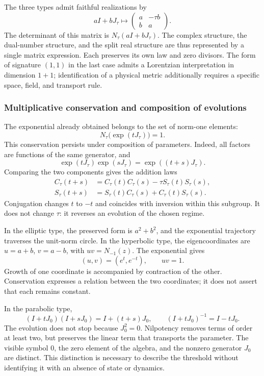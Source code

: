 The three types admit faithful realizations by
\[
 aI+bJ_\tau\longmapsto
 \begin{pmatrix}a&-\tau b\\b&a\end{pmatrix}.
\]
The determinant of this matrix is \(N_\tau(aI+bJ_\tau)\).
The complex structure, the dual-number structure, and the split real
structure are thus represented by a single matrix expression.
Each preserves its own law and zero divisors. The form of signature
\((1,1)\) in the last case admits a Lorentzian interpretation in dimension
\(1+1\); identification of a physical metric additionally requires a
specific space, field, and transport rule.

\subsubsection{Multiplicative conservation and composition of evolutions}
\label{trit-ampl-evoluciones}

The exponential already obtained belongs to the set of norm-one elements:
\[
 N_\tau\bigl(\exp(tJ_\tau)\bigr)=1.
\]
This conservation persists under composition of parameters. Indeed, all
factors are functions of the same generator, and
\[
 \exp(tJ_\tau)\exp(sJ_\tau)=\exp((t+s)J_\tau).
\]
Comparing the two components gives the addition laws
\begin{align}
 C_\tau(t+s)&=C_\tau(t)C_\tau(s)-\tau S_\tau(t)S_\tau(s),\\
 S_\tau(t+s)&=S_\tau(t)C_\tau(s)+C_\tau(t)S_\tau(s).
\end{align}
Conjugation changes \(t\) to \(-t\) and coincides with inversion within
this subgroup. It does not change \(\tau\): it reverses an evolution of
the chosen regime.

In the elliptic type, the preserved form is \(a^2+b^2\), and the exponential
trajectory traverses the unit-norm circle. In the hyperbolic type, the
eigencoordinates are \(u=a+b\), \(v=a-b\), with \(uv=N_{-1}(z)\).
The exponential gives
\[
 (u,v)=(e^t,e^{-t}),\qquad uv=1.
\]
Growth of one coordinate is accompanied by contraction of the other.
Conservation expresses a relation between the two coordinates; it does
not assert that each remains constant.

In the parabolic type,
\[
 (I+tJ_0)(I+sJ_0)=I+(t+s)J_0,\qquad
 (I+tJ_0)^{-1}=I-tJ_0.
\]
The evolution does not stop because \(J_0^2=0\). Nilpotency removes terms
of order at least two, but preserves the linear term that transports
the parameter. The visible symbol \(0\), the zero element of the algebra,
and the nonzero generator \(J_0\) are distinct. This distinction is
necessary to describe the threshold without identifying it with an absence
of state or dynamics.


